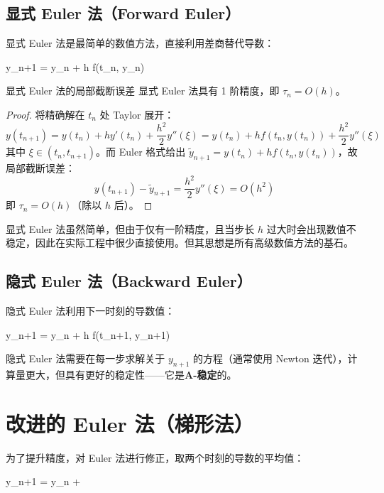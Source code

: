 \subsection{显式 Euler 法（Forward Euler）}

显式 Euler 法是最简单的数值方法，直接利用差商替代导数：
\begin{myformula}
	y_{n+1} = y_n + h f(t_n, y_n)
\end{myformula}

\begin{theorem}{显式 Euler 法的局部截断误差}
	显式 Euler 法具有 1 阶精度，即 $\tau_n = O(h)$。
\end{theorem}

\begin{proof}
	将精确解在 $t_n$ 处 Taylor 展开：
	\[
	y(t_{n+1}) = y(t_n) + h y'(t_n) + \frac{h^2}{2} y''(\xi) = y(t_n) + h f(t_n, y(t_n)) + \frac{h^2}{2} y''(\xi)
	\]
	其中 $\xi \in (t_n, t_{n+1})$。而 Euler 格式给出 $\tilde{y}_{n+1} = y(t_n) + h f(t_n, y(t_n))$，故局部截断误差：
	\[
	y(t_{n+1}) - \tilde{y}_{n+1} = \frac{h^2}{2} y''(\xi) = O(h^2)
	\]
	即 $\tau_n = O(h)$（除以 $h$ 后）。
\end{proof}

\begin{remark}
	显式 Euler 法虽然简单，但由于仅有一阶精度，且当步长 $h$ 过大时会出现数值不稳定，因此在实际工程中很少直接使用。但其思想是所有高级数值方法的基石。
\end{remark}

\subsection{隐式 Euler 法（Backward Euler）}

隐式 Euler 法利用下一时刻的导数值：
\begin{myformula}
	y_{n+1} = y_n + h f(t_{n+1}, y_{n+1})
\end{myformula}

\begin{remark}
	隐式 Euler 法需要在每一步求解关于 $y_{n+1}$ 的方程（通常使用 Newton 迭代），计算量更大，但具有更好的稳定性——它是\textbf{A-稳定}的。
\end{remark}

\section{改进的 Euler 法（梯形法）}

为了提升精度，对 Euler 法进行修正，取两个时刻的导数的平均值：
\begin{myformula}
	y_{n+1} = y_n +  \left[ f(t_n, y_n) + f(t_{n+1}, y_{n+1}) \right]
\end{myformula}

